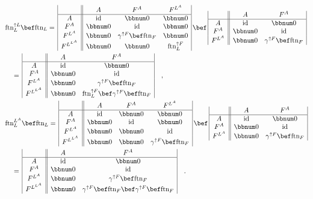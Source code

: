 \begin{align*}
 & \text{ftn}_{L}^{\uparrow L}\bef\text{ftn}_{L}=\,\begin{array}{|c||ccc|}
 & A & F^{A} & F^{L^{A}}\\
\hline A & \text{id} & \bbnum 0 & \bbnum 0\\
F^{A} & \bbnum 0 & \text{id} & \bbnum 0\\
F^{L^{A}} & \bbnum 0 & \gamma^{\uparrow F}\bef\text{ftn}_{F} & \bbnum 0\\
F^{L^{L^{A}}} & \bbnum 0 & \bbnum 0 & \text{ftn}_{L}^{\uparrow F}
\end{array}\,\bef\,\begin{array}{|c||cc|}
 & A & F^{A}\\
\hline A & \text{id} & \bbnum 0\\
F^{A} & \bbnum 0 & \text{id}\\
F^{L^{A}} & \bbnum 0 & \gamma^{\uparrow F}\bef\text{ftn}_{F}
\end{array}\\
 & \quad=\,\begin{array}{|c||cc|}
 & A & F^{A}\\
\hline A & \text{id} & \bbnum 0\\
F^{A} & \bbnum 0 & \text{id}\\
F^{L^{A}} & \bbnum 0 & \gamma^{\uparrow F}\bef\text{ftn}_{F}\\
F^{L^{L^{A}}} & \bbnum 0 & \text{ftn}_{L}^{\uparrow F}\bef\gamma^{\uparrow F}\bef\text{ftn}_{F}
\end{array}\quad,\\
 & \text{ftn}_{L}^{L^{A}}\bef\text{ftn}_{L}=\,\begin{array}{|c||ccc|}
 & A & F^{A} & F^{L^{A}}\\
\hline A & \text{id} & \bbnum 0 & \bbnum 0\\
F^{A} & \bbnum 0 & \text{id} & \bbnum 0\\
F^{L^{A}} & \bbnum 0 & \bbnum 0 & \text{id}\\
F^{L^{L^{A}}} & \bbnum 0 & \bbnum 0 & \gamma^{\uparrow F}\bef\text{ftn}_{F}
\end{array}\,\bef\,\begin{array}{|c||cc|}
 & A & F^{A}\\
\hline A & \text{id} & \bbnum 0\\
F^{A} & \bbnum 0 & \text{id}\\
F^{L^{A}} & \bbnum 0 & \gamma^{\uparrow F}\bef\text{ftn}_{F}
\end{array}\\
 & \quad=\,\begin{array}{|c||cc|}
 & A & F^{A}\\
\hline A & \text{id} & \bbnum 0\\
F^{A} & \bbnum 0 & \text{id}\\
F^{L^{A}} & \bbnum 0 & \gamma^{\uparrow F}\bef\text{ftn}_{F}\\
F^{L^{L^{A}}} & \bbnum 0 & \gamma^{\uparrow F}\bef\text{ftn}_{F}\bef\gamma^{\uparrow F}\bef\text{ftn}_{F}
\end{array}\quad.
\end{align*}
